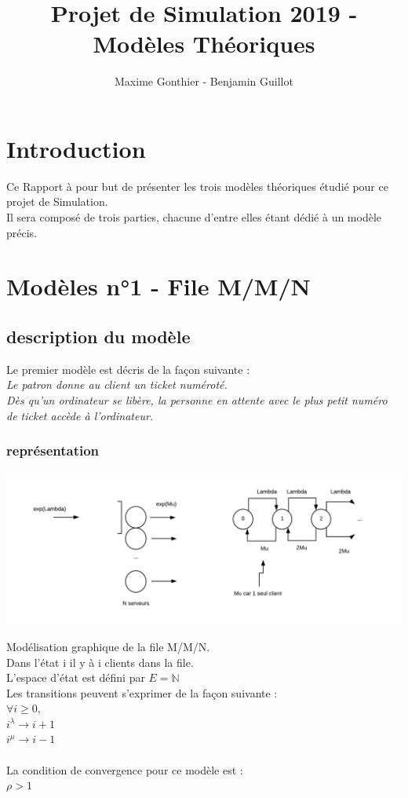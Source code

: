 \documentclass[a4paper,11pt]{article}
\title{Projet de Simulation 2019 - Modèles Théoriques}
\author{Maxime Gonthier - Benjamin Guillot}
\begin{document}
\clearpage
\maketitle

\newpage
\tableofcontents

\newpage
\section{Introduction}
	Ce Rapport à pour but de présenter les trois modèles théoriques étudié pour ce projet de Simulation.\\
	Il sera composé de trois parties, chacune d'entre elles étant dédié à un modèle précis.
\section{Modèles n°1 - File M/M/N}
	\subsection{description du modèle}
	Le premier modèle est décris de la façon suivante :\\
	\textit{Le patron donne au client un ticket numéroté.\\
			Dès qu'un ordinateur se libère, la personne en attente avec le plus petit numéro de ticket accède à l'ordinateur.}
		\subsubsection{représentation}
		\centerline{\includegraphics[scale=0.5]{MMN.png}}
		Modélisation graphique de la file M/M/N.\\
		Dans l'état i il y à i clients dans la file.\\
		L'espace d'état est défini par $E=\pmb{\mathbb{N}}$\\
		Les transitions peuvent s'exprimer de la façon suivante :\\
		$\forall i \ge 0,$\\
		$i^{\lambda} \to i + 1 $\\
		$i^{\mu} \to i - 1$\\
		\\
		La condition de convergence pour ce modèle est :\\
		$\rho > 1$
\end{document}
